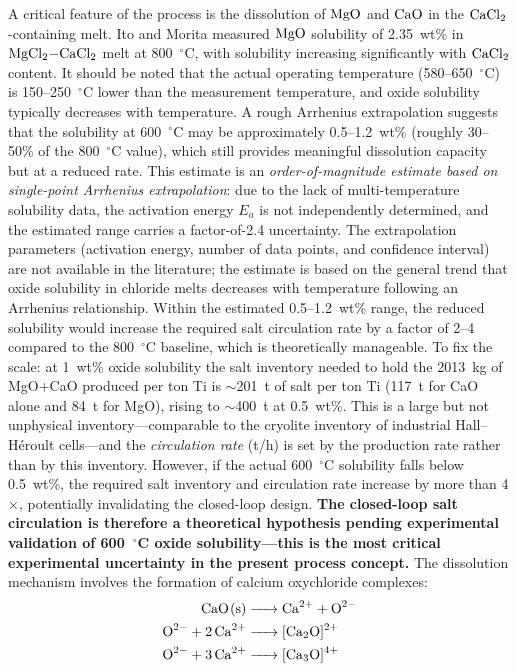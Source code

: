 \documentclass[sn-mathphys,Numbered]{sn-jnl}
\begin{document}
A critical feature of the process is the dissolution of $\ce{MgO}$ and $\ce{CaO}$ in the $\ce{CaCl2}$-containing melt. Ito and Morita \cite{morita2004} measured $\ce{MgO}$ solubility of 2.35~wt\% in $\ce{MgCl2-CaCl2}$ melt at 800~$^{\circ}$C, with solubility increasing significantly with $\ce{CaCl2}$ content. It should be noted that the actual operating temperature (580--650~$^{\circ}$C) is 150--250~$^{\circ}$C lower than the measurement temperature, and oxide solubility typically decreases with temperature. A rough Arrhenius extrapolation suggests that the solubility at 600~$^{\circ}$C may be approximately 0.5--1.2~wt\% (roughly 30--50\% of the 800~$^{\circ}$C value), which still provides meaningful dissolution capacity but at a reduced rate. This estimate is an \emph{order-of-magnitude estimate based on single-point Arrhenius extrapolation}: due to the lack of multi-temperature solubility data, the activation energy $E_a$ is not independently determined, and the estimated range carries a factor-of-2.4 uncertainty. The extrapolation parameters (activation energy, number of data points, and confidence interval) are not available in the literature; the estimate is based on the general trend that oxide solubility in chloride melts decreases with temperature following an Arrhenius relationship. Within the estimated 0.5--1.2~wt\% range, the reduced solubility would increase the required salt circulation rate by a factor of 2--4 compared to the 800~$^{\circ}$C baseline, which is theoretically manageable. To fix the scale: at 1~wt\% oxide solubility the salt inventory needed to hold the 2013~kg of MgO+CaO produced per ton Ti is $\sim$201~t of salt per ton Ti (117~t for CaO alone and 84~t for MgO), rising to $\sim$400~t at 0.5~wt\%. This is a large but not unphysical inventory---comparable to the cryolite inventory of industrial Hall--H\'eroult cells---and the \emph{circulation rate} (t/h) is set by the production rate rather than by this inventory. However, if the actual 600~$^{\circ}$C solubility falls below 0.5~wt\%, the required salt inventory and circulation rate increase by more than 4$\times$, potentially invalidating the closed-loop design. \textbf{The closed-loop salt circulation is therefore a theoretical hypothesis pending experimental validation of 600~$^{\circ}$C oxide solubility---this is the most critical experimental uncertainty in the present process concept.} The dissolution mechanism involves the formation of calcium oxychloride complexes:
\begin{align}
\ce{CaO(s) &-> Ca^{2+} + O^{2-}} \label{eq:diss1} \\
\ce{O^{2-} + 2Ca^{2+} &-> [Ca2O]^{2+}} \label{eq:diss2} \\
\ce{O^{2-} + 3Ca^{2+} &-> [Ca3O]^{4+}} \label{eq:diss3}
\end{align}
\end{document}
